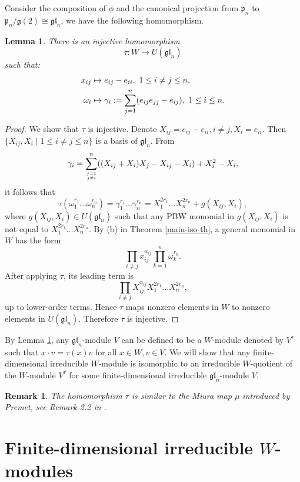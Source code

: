 \documentclass[12pt,a4paper]{amsart}
\newtheorem{remark}[theorem]{Remark}%
\newtheorem{lemma}[theorem]{Lemma}%
\numberwithin{equation}{section}
\def\mg{\mathfrak{g}}
\def\gl{\mathfrak{gl}}
\begin{document}
Consider the composition of $\phi$ and the canonical projection
from $\mathfrak{p}_n$ to $\mathfrak{p}_n/\mg(2)\cong \gl_n$,
we have the following homomorphism.

\begin{lemma}\label{tau}
There is an injective  homomorphism
 $$\tau:W\rightarrow U(\gl_n)$$ such that:
\begin{equation}\label{x-w-act}\aligned x_{ij} & \mapsto  e_{ij}-e_{ii},\ 1\leq i\neq j\leq n,\\
 \omega_i
&\mapsto \gamma_i:=\sum_{j=1}^n (e_{ij}e_{jj}-e_{ij}),\ 1\leq i\leq n.
\endaligned \end{equation}
\end{lemma}

\begin{proof}We show that $\tau$ is injective. Denote $X_{ij}=e_{ij}-e_{ii}, i\neq j, X_i=e_{ii}$. Then $\{X_{ij}, X_i\mid 1\leq i\neq j\leq n\}$ is a basis of $\gl_n$.
From $$\gamma_i=\sum\limits_{j=1\atop j\neq i}^n ((X_{ij}+X_i)X_j-X_{ij}-X_i)+X_i^2-X_i,$$
it follows that
$$\tau(\omega_1^{r_1}\dots\omega_n^{r_n})=\gamma_1^{r_1}\dots\gamma_n^{r_n}=X_1^{2r_1}\dots X_n^{2r_n}
+g(X_{ij},X_i),$$
where $g(X_{ij},X_i)\in U(\gl_n)$ such that any PBW monomial in $g(X_{ij},X_i)$
is not equal to $X_1^{2r_1}\dots X_n^{2r_n}$.
By (b) in Theorem \ref{main-iso-th}, a general monomial in $W$  has the form
$$\prod_{i\neq j}x_{ij}^{\alpha_{ij}}\prod_{k=1}^n\omega_k^{r_k}.$$
After applying $\tau$, its leading term is
$$\prod_{i\neq j}X_{ij}^{\alpha_{ij}}X_1^{2r_1}\dots X_n^{2r_n},$$
up to lower-order terms.
Hence
 $\tau$ maps nonzero elements
in $W$
to   nonzero elements in $U(\gl_n)$.
Therefore $\tau$ is injective.
\end{proof}


By Lemma \ref{tau}, any  $\gl_n$-module $V$
can be defined to be a $W$-module denoted by $V^\tau$
such that $x\cdot v=\tau(x)v$ for all $x\in W,v\in V$.
We will show that any finite-dimensional irreducible $W$-module is
isomorphic to an irreducible $W$-quotient of the $W$-module $V^\tau$ for some finite-dimensional irreducible $\gl_n$-module $V$.

\begin{remark}The homomorphism $\tau$ is similar to the {\it Miura map}
$\mu$  introduced by Premet, see Remark 2.2 in \cite{Pr2}.
\end{remark}

\section{Finite-dimensional irreducible $W$-modules}\label{Sec.3}
\end{document}
